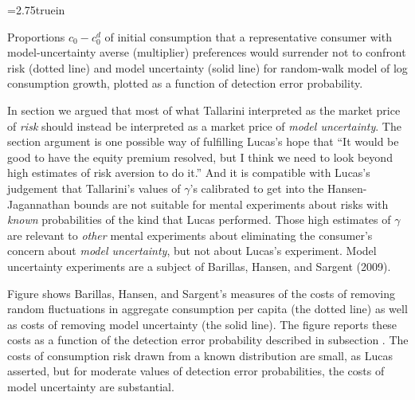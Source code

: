 \centerline{\epsfxsize=2.75truein}
\caption{Proportions $c_0- c_0^d$ of
initial consumption  that a representative consumer with model-uncertainty averse (multiplier) preferences would surrender not to confront risk (dotted line) and model uncertainty (solid line)  for random-walk model of log consumption growth, plotted as a function of detection error probability.}
\endfigure

In section  we argued that most of what Tallarini interpreted as the market price of {\it risk\/} should instead be interpreted
as a market price of {\it model uncertainty}.  The section  argument    is one possible way of fulfilling Lucas's hope that ``It would be good to have the equity
premium resolved, but I think we need to look beyond high
estimates of risk aversion to do it.''  And it is compatible with Lucas's judgement that Tallarini's values of $\gamma$'s calibrated to get into the Hansen-Jagannathan bounds are
not suitable for mental experiments about risks with {\it known\/} probabilities of the kind that Lucas performed.
Those high estimates of $\gamma$ are relevant to {\it other\/} mental experiments about eliminating the consumer's concern about {\it model uncertainty\/}, but not
about Lucas's experiment. Model uncertainty  experiments are a subject of Barillas, Hansen, and Sargent (2009).

Figure  shows Barillas, Hansen, and Sargent's measures of the costs of removing random fluctuations in aggregate consumption per capita (the dotted line) as well as costs of removing
model uncertainty (the solid line). The figure reports these costs  as a function of the detection error probability described in subsection .  The costs of consumption risk drawn from a known distribution are small, as Lucas asserted, but for moderate
values of detection error probabilities, the costs of model uncertainty are substantial.
%




